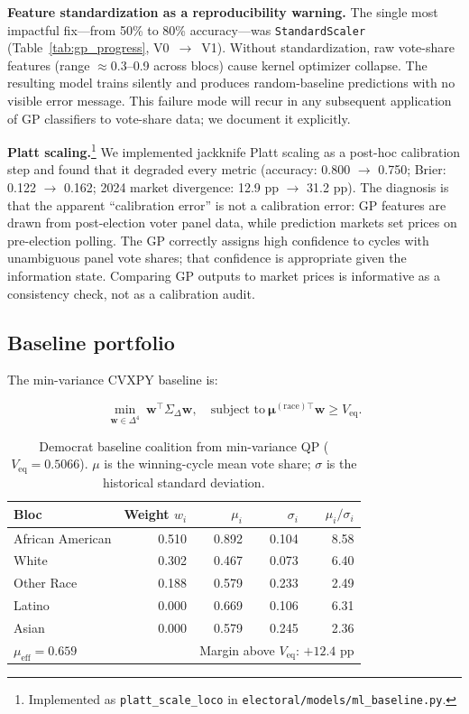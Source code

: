\documentclass[12pt, letterpaper]{article}
\theoremstyle{definition}
\newcommand{\mueff}{\mu_{\mathrm{eff}}}
\newcommand{\Veq}{V_{\mathrm{eq}}}
\newcommand{\SigmaDelta}{\Sigma_{\Delta}}
\newcommand{\boldw}{\mathbf{w}}
\newcommand{\boldmu}{\boldsymbol{\mu}}
\begin{document}
\textbf{Feature standardization as a reproducibility warning.} The
single most impactful fix---from 50\% to 80\% accuracy---was
\texttt{StandardScaler} (Table~\ref{tab:gp_progress}, V0~$\to$~V1).
Without standardization, raw vote-share features (range $\approx$0.3--0.9
across blocs) cause kernel optimizer collapse. The resulting model trains
silently and produces random-baseline predictions with no visible error
message. This failure mode will recur in any subsequent application of GP
classifiers to vote-share data; we document it explicitly.

\textbf{Platt scaling.}\footnote{Implemented as \texttt{platt\_scale\_loco} in
\texttt{electoral/models/ml\_baseline.py}.} We implemented jackknife Platt
scaling as a post-hoc calibration step and found that it degraded every metric (accuracy: 0.800
$\to$ 0.750; Brier: 0.122 $\to$ 0.162; 2024 market divergence: 12.9 pp
$\to$ 31.2 pp). The diagnosis is that the apparent ``calibration error'' is
not a calibration error: GP features are drawn from post-election voter panel
data, while prediction markets set prices on pre-election polling. The GP
correctly assigns high confidence to cycles with unambiguous panel vote
shares; that confidence is appropriate given the information state. Comparing
GP outputs to market prices is informative as a consistency check, not as a
calibration audit.

\subsection{Baseline portfolio}
\label{sec:baseline_portfolio}

The min-variance CVXPY baseline is:

\begin{equation}
  \min_{\boldw \in \Delta^4}\ \boldw^\top \SigmaDelta \boldw,
  \quad
  \text{subject to}\ \boldmu^{(\text{race})\top} \boldw \geq \Veq.
  \label{eq:minvar}
\end{equation}

\begin{table}[h]
\centering
\caption{Democrat baseline coalition from min-variance QP ($V_{\mathrm{eq}} = 0.5066$).
$\mu$ is the winning-cycle mean vote share; $\sigma$ is the historical standard deviation.}
\label{tab:baseline}
\begin{tabular}{lrrrr}
\toprule
Bloc & Weight $w_i$ & $\mu_i$ & $\sigma_i$ & $\mu_i / \sigma_i$ \\
\midrule
African American & 0.510 & 0.892 & 0.104 & 8.58 \\
White            & 0.302 & 0.467 & 0.073 & 6.40 \\
Other Race       & 0.188 & 0.579 & 0.233 & 2.49 \\
Latino           & 0.000 & 0.669 & 0.106 & 6.31 \\
Asian            & 0.000 & 0.579 & 0.245 & 2.36 \\
\midrule
\multicolumn{2}{l}{$\mueff = 0.659$} & \multicolumn{3}{r}{Margin above $\Veq$: $+12.4$ pp} \\
\bottomrule
\end{tabular}
\end{table}
\end{document}
